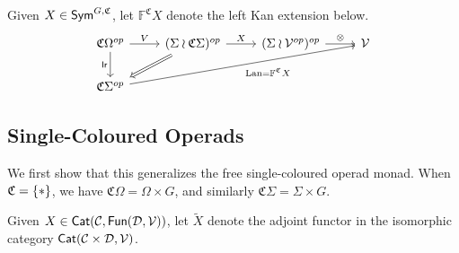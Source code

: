 \documentclass[a4paper,10pt
,draft
]{article}%
\begin{document}
\begin{definition}
      Given $X \in \mathsf{Sym}^{G, \mathfrak C}$, let $\mathbb F^{\mathfrak C} X$ denote the left Kan extension below.
      \begin{equation} 
           \begin{tikzcd}
                  \mathfrak C \Omega^{op}
                  \arrow[d, "\mathsf{lr}"']
                  \arrow[r, "V"]
                  &
                  (\Sigma \wr \mathfrak C \Sigma)^{op} \arrow[r, "X"]
                  \arrow[dl, Rightarrow]
                  &
                  (\Sigma \wr \V^{op})^{op} \arrow[r, "\otimes"]
                  &
                  \V
                  \\
                  \mathfrak C \Sigma^{op} \arrow[urrr, "\Lan = \mathbb F^{\mathfrak C} X"']
            \end{tikzcd}
      \end{equation}
\end{definition}


\subsection{Single-Coloured Operads}
We first show that this generalizes the free single-coloured operad monad.
When $\mathfrak C = \set{\**}$, we have
$\mathfrak C \Omega = \Omega \times G$, and similarly
$\mathfrak C \Sigma = \Sigma \times G$.

\begin{notation}
      Given $X \in \mathsf{Cat}(\mathcal{C}, \mathsf{Fun}(\mathcal D, \mathcal V))$,
      let $\tilde X$ denote the adjoint functor in the isomorphic category $\mathsf{Cat}(\mathcal{C} \times \mathcal D, \mathcal V)$.
\end{notation}
\end{document}
